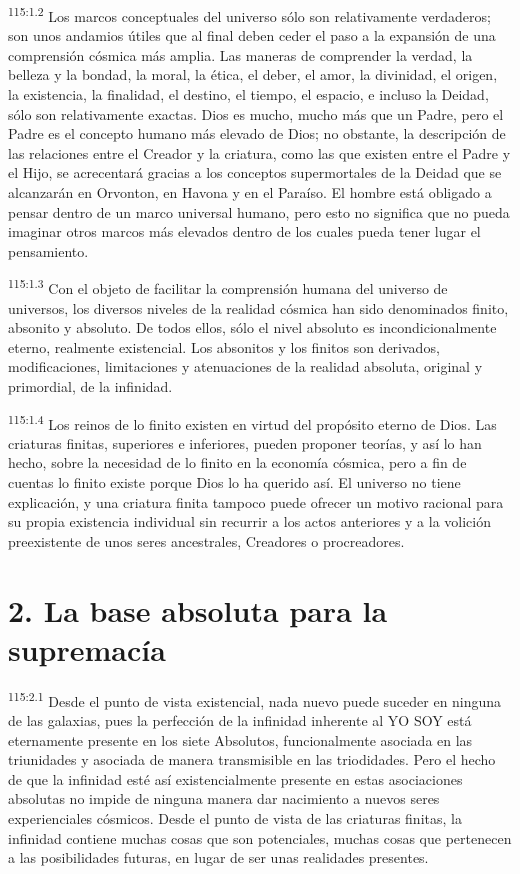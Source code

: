 \documentclass[twoside, 11pt]{book}
\begin{document}
\par
\textsuperscript{115:1.2} Los marcos conceptuales del universo sólo son relativamente verdaderos; son unos andamios útiles que al final deben ceder el paso a la expansión de una comprensión cósmica más amplia. Las maneras de comprender la verdad, la belleza y la bondad, la moral, la ética, el deber, el amor, la divinidad, el origen, la existencia, la finalidad, el destino, el tiempo, el espacio, e incluso la Deidad, sólo son relativamente exactas. Dios es mucho, mucho más que un Padre, pero el Padre es el concepto humano más elevado de Dios; no obstante, la descripción de las relaciones entre el Creador y la criatura, como las que existen entre el Padre y el Hijo, se acrecentará gracias a los conceptos supermortales de la Deidad que se alcanzarán en Orvonton, en Havona y en el Paraíso. El hombre está obligado a pensar dentro de un marco universal humano, pero esto no significa que no pueda imaginar otros marcos más elevados dentro de los cuales pueda tener lugar el pensamiento.

\par
\textsuperscript{115:1.3} Con el objeto de facilitar la comprensión humana del universo de universos, los diversos niveles de la realidad cósmica han sido denominados finito, absonito y absoluto. De todos ellos, sólo el nivel absoluto es incondicionalmente eterno, realmente existencial. Los absonitos y los finitos son derivados, modificaciones, limitaciones y atenuaciones de la realidad absoluta, original y primordial, de la infinidad.

\par
\textsuperscript{115:1.4} Los reinos de lo finito existen en virtud del propósito eterno de Dios. Las criaturas finitas, superiores e inferiores, pueden proponer teorías, y así lo han hecho, sobre la necesidad de lo finito en la economía cósmica, pero a fin de cuentas lo finito existe porque Dios lo ha querido así. El universo no tiene explicación, y una criatura finita tampoco puede ofrecer un motivo racional para su propia existencia individual sin recurrir a los actos anteriores y a la volición preexistente de unos seres ancestrales, Creadores o procreadores.

\section*{2. La base absoluta para la supremacía}
\par
\textsuperscript{115:2.1} Desde el punto de vista existencial, nada nuevo puede suceder en ninguna de las galaxias, pues la perfección de la infinidad inherente al YO SOY está eternamente presente en los siete Absolutos, funcionalmente asociada en las triunidades y asociada de manera transmisible en las triodidades. Pero el hecho de que la infinidad esté así existencialmente presente en estas asociaciones absolutas no impide de ninguna manera dar nacimiento a nuevos seres experienciales cósmicos. Desde el punto de vista de las criaturas finitas, la infinidad contiene muchas cosas que son potenciales, muchas cosas que pertenecen a las posibilidades futuras, en lugar de ser unas realidades presentes.
\end{document}
